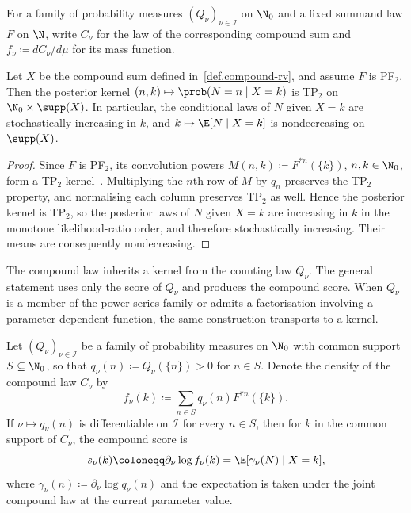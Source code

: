 \documentclass[11pt]{article}
\begin{document}
For a family of probability measures \((Q_\nu)_{\nu\in\mathcal I}\) on $\N_0$ and a fixed summand law $F$ on $\N$, write \(C_\nu\) for the law of the corresponding compound sum and \(f_\nu\coloneqq dC_\nu/d\mu\) for its mass function.

\begin{lem}
\label{lem:cond-mean-monotone}
Let $X$ be the compound sum defined in~\eqref{def.compound-rv}, and assume \(F\) is PF$_2$. Then the posterior kernel \((n,k)\mapsto\prob(N=n\mid X=k)\) is TP$_2$ on $\N_0\times\supp(X)$. In particular, the conditional laws of \(N\) given \(X=k\) are stochastically increasing in \(k\), and \(k\mapsto\E[N\mid X=k]\) is nondecreasing on \(\supp(X)\).
\end{lem}

\begin{proof}
Since \(F\) is PF$_2$, its convolution powers $M(n,k)\coloneqq F^{*n}(\{k\})$, $n,k\in\N_0$, form a TP$_2$ kernel~\cite{Karlin1968}. Multiplying the \(n\)th row of $M$ by \(q_n\) preserves the TP$_2$ property, and normalising each column preserves TP$_2$ as well. Hence the posterior kernel is TP$_2$, so the posterior laws of \(N\) given \(X=k\) are increasing in \(k\) in the monotone likelihood-ratio order, and therefore stochastically increasing. Their means are consequently nondecreasing.
\end{proof}

The compound law inherits a kernel from the counting law \(Q_\nu\). The general statement uses only the score of \(Q_\nu\) and produces the compound score. When \(Q_\nu\) is a member of the power-series family or admits a factorisation involving a parameter-dependent function, the same construction transports to a kernel.



%
\begin{prop}
	\label{prop:compound-score}
	Let \((Q_\nu)_{\nu\in\mathcal I}\) be a family of probability measures on \(\N_0\) with common support \(S\subseteq\N_0\), so that \(q_\nu(n)\coloneqq Q_\nu(\{n\})>0\) for \(n\in S\). Denote the density of the compound law \(C_\nu\) by
	\[
	f_\nu(k)\coloneqq \sum_{n\in S} q_\nu(n)F^{*n}(\{k\}).
	\]
If \(\nu\mapsto q_\nu(n)\) is differentiable on \(\mathcal I\) for every \(n\in S\), then for \(k\) in the common support of \(C_\nu\), the compound score is
	\begin{equation}
		\label{eq:compound-score}
		s_\nu(k)\coloneqq \partial_\nu\log f_\nu(k)=\E[\gamma_\nu(N)\mid X=k],
	\end{equation}
	where \(\gamma_\nu(n)\coloneqq \partial_\nu\log q_\nu(n)\) and the expectation is taken under the joint compound law at the current parameter value.
\end{prop}
\end{document}
